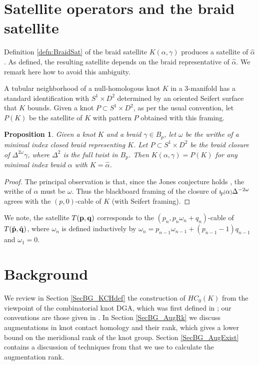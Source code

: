 \documentclass[11pt]{amsart}
\newcommand*{\smallp}[1]{\scalebox{.75}{\ensuremath#1}}
\newcommand{\pp}[2][p]{\imath_{\hspace*{-1pt}#1}\hspace*{-.5pt}\smallp(#2\smallp)}
\newtheorem{prop}[thm]{Proposition}
\theoremstyle{definition}
\begin{document}
\section{Satellite operators and the braid satellite}
\label{SecAsSatelliteOp}

Definition \ref{defn:BraidSat} of the braid satellite $K(\alpha,\gamma)$ produces a satellite of $\hat{\alpha}$. As defined, the resulting satellite depends on the braid representative of $\hat{\alpha}$. We remark here how to avoid this ambiguity.

A tubular neighborhood of a null-homologous knot $K$ in a 3-manifold has a standard identification with $S^1\times D^2$ determined by an oriented Seifert surface that $K$ bounds. Given a knot $P\subset S^1\times D^2$, as per the usual convention, let $P(K)$ be the satellite of $K$ with pattern $P$ obtained with this framing.

\begin{prop}\label{PropAsSatelliteOp}Given a knot $K$ and a braid $\gamma\in B_p$, let $\omega$ be the writhe of a minimal index closed braid representing $K$. Let $P\subset S^1\times D^2$ be the braid closure of $\Delta^{2\omega}\gamma$, where $\Delta^2$ is the full twist in $B_p$. Then $K(\alpha,\gamma) = P(K)$ for any minimal index braid $\alpha$ with $K=\hat{\alpha}$.
\end{prop}
\begin{proof}The principal observation is that, since the Jones conjecture holds \cite{DP12,LM12}, the writhe of $\alpha$ must be $\omega$. Thus the blackboard framing of the closure of $\pp\alpha\Delta^{-2\omega}$ agrees with the $(p,0)$-cable of $K$ (with Seifert framing).
\end{proof}

We note, the satellite $T({\bf p},{\bf q})$ corresponds to the $(p_n,p_n\omega_n+q_n)$-cable of $T(\hat{\bf p},\hat{\bf q})$, where $\omega_n$ is defined inductively by $\omega_n=p_{n-1}\omega_{n-1}+(p_{n-1}-1)q_{n-1}$ and $\omega_1=0$.

\section{Background}
\label{SecBG}

  We review in Section \ref{SecBG_KCHdef} the construction of $HC_0(K)$ from the viewpoint of the combinatorial knot DGA, which was first defined in \cite{Ng08}; our conventions are those given in \cite{Ng12}. In Section \ref{SecBG_AugRk} we discuss augmentations in knot contact homology and their rank, which gives a lower bound on the meridional rank of the knot group. Section \ref{SecBG_AugExist} contains a discussion of techniques from \cite{Cor13a} that we use to calculate the augmentation rank.
\end{document}
